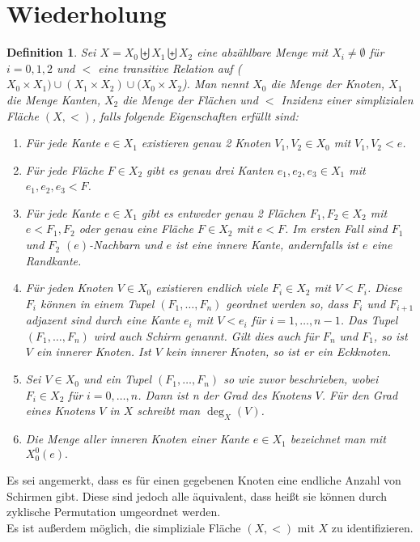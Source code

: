 \documentclass[12pt,titlepage]{article}
\newtheorem{definition}{Definition}[section]
\begin{document}
\section{Wiederholung}
\begin{definition}  \label{def1} Sei $X=X_{0} \biguplus X_{1} \biguplus X_{2}$ eine abzählbare Menge mit $X_{i} \ne \emptyset$ für $i=0,1,2$ und $<$ eine transitive Relation auf  ($X_{0}\times X_{1}) \cup (X_{1}\times X_{2})\cup (X_{0}\times X_{2}$). Man nennt $X_{0}$ \emph{die Menge der Knoten}, $X_{1}$ \emph{die Menge Kanten}, $X_{2}$ \emph{die Menge der Flächen} und $<$ \emph{Inzidenz} einer \emph{simplizialen Fläche} $(X,<)$, falls folgende Eigenschaften erfüllt sind:
 \begin{enumerate}
\item Für jede Kante $e \in X_{1}$ existieren genau 2 Knoten $V_1,V_2 \in X_{0}$ mit $V_1,V_2 < e$. 
\item Für jede Fläche $F\in X_2$ gibt es genau drei Kanten $e_1,e_2,e_3 \in X_{1}$ mit $e_1,e_2,e_3 < F$. 
\item Für jede Kante $e \in X_{1}$ gibt es entweder genau 2 Flächen $F_{1},F_{2} \in X_{2}$ mit $e <F_{1},F_2$ oder
genau eine Fläche $F \in X_{2}$ mit $e < F$. Im ersten Fall sind $F_{1}$ und $F_{2}$ \emph{$(e)$-Nachbarn} und $e$ ist eine \emph{innere Kante}, andernfalls ist $e$ eine \emph{Randkante}. 
\item Für jeden Knoten $V \in X_{0}$ existieren endlich viele $F_{i}\in X_{2}$ mit $V < F_{i}$. Diese $F_{i}$ können in einem Tupel $(F_{1},\ldots,F_{n})$ geordnet werden so, dass $F_{i}$ und $F_{i+1}$ adjazent sind durch eine Kante $e_{i}$ mit $V <e_{i}$ für $i=1, \ldots, n-1$. Das Tupel $(F_1,\ldots,F_n)$ wird auch \emph{Schirm} genannt. Gilt dies auch für $F_{n}$ und $F_{1}$, so ist $V$ ein \emph{innerer} Knoten. Ist $V$ kein innerer Knoten, so ist er 
 ein Eckknoten. 
 \item Sei $V \in X_0$ und ein Tupel $(F_1,\ldots,F_n)$ so wie zuvor beschrieben, wobei $F_i \in X_2$ für $i=0,\ldots,n$. Dann ist n der \emph{Grad des Knotens} $V$. Für den Grad eines Knotens $V$ in $X$ schreibt man $\deg_X(V)$.
 \item Die Menge aller inneren Knoten einer Kante $e \in X_1$ bezeichnet man mit $X_0^0(e).$
\end{enumerate}
\end{definition}
Es sei angemerkt, dass es für einen gegebenen Knoten eine endliche Anzahl von Schirmen gibt. Diese sind jedoch alle äquivalent, dass heißt sie können durch zyklische Permutation umgeordnet werden.\\ Es ist außerdem möglich, die simpliziale Fläche $(X,<)$ mit $X$ zu identifizieren.
\end{document}
